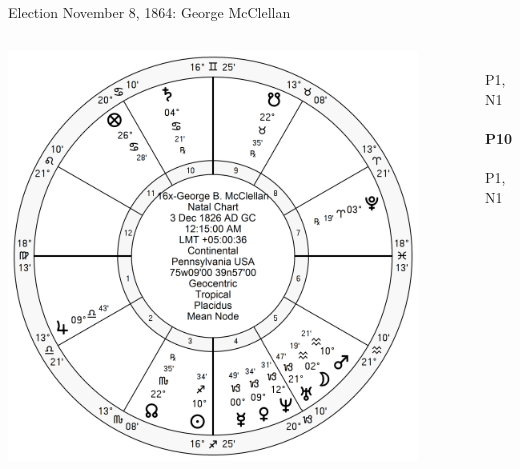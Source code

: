 \begin{frame}[t]{Election November 8, 1864: George McClellan}
\small
\begin{columns}[T, onlytextwidth]
\vspace{-1em}
{\includegraphics[width=0.9\textwidth]{charts/McClellan.png}}
\fontsize{8pt}{9pt}\selectfont

\Venus\, \Sextile\, P1, N1 \\
\Moon\, \textbf{\Opposition\, P10} \\
\Mercury\, \Sextile\, P1, N1 \\



\end{columns}
\end{frame}
